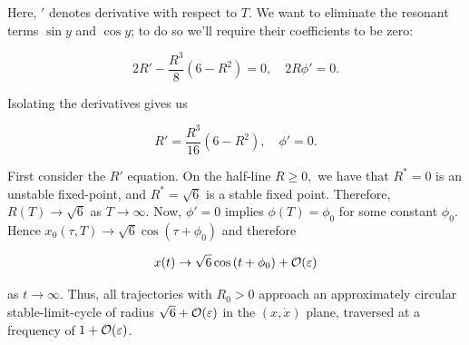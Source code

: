\documentclass{article}
\begin{document}
Here, $'$ denotes derivative with respect to $T.$ We want to eliminate the resonant terms $\sin{y}$ and $\cos{y}$; to do so we'll require their coefficients to be zero:

\[ 2R' - \frac{R^3}{8}(6 - R^2)  = 0, \quad 2R\phi'  = 0. \]

Isolating the derivatives gives us

\[ R' = \frac{R^3}{16}(6 - R^2), \quad \phi'  = 0. \]

First consider the $R'$ equation. On the half-line $R \geq 0,$ we have that $R^* = 0$ is an unstable \@{fixed-point}, and $R^* = \sqrt{6}$ is a \@{stable} fixed point. Therefore, $R(T) \to \sqrt{6}$ as $T \to \infty.$ Now, $\phi' = 0$ implies $\phi(T) = \phi_0$ for some constant $\phi_0.$ Hence $x_0(\tau, T) \to \sqrt{6}\cos{(\tau + \phi_0)}$ and therefore

\[ x(t) \to \sqrt{6}\cos{(t + \phi_0)} + \mathcal{O}\!\left(\varepsilon\right) \]

as $t \to \infty.$ Thus, all \@{trajectories} with $R_0 > 0$ approach an approximately circular \@{stable-limit-cycle} of radius $\sqrt{6} + \mathcal{O}\!\left(\varepsilon\right)$ in the $(x, \dot{x})$ plane, traversed at a frequency of $1 + \mathcal{O}\!\left(\varepsilon\right)$.
\end{document}
